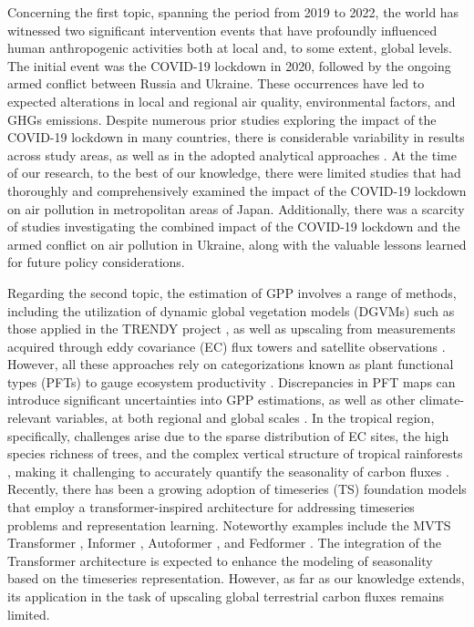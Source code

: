 Concerning the first topic, spanning the period from 2019 to 2022, the world has witnessed two significant intervention events that have profoundly influenced human anthropogenic activities both at local and, to some extent, global levels. The initial event was the COVID-19 lockdown in 2020, followed by the ongoing armed conflict between Russia and Ukraine. These occurrences have led to expected alterations in local and regional air quality, environmental factors, and GHGs emissions. Despite numerous prior studies exploring the impact of the COVID-19 lockdown in many countries, there is considerable variability in results across study areas, as well as in the adopted analytical approaches \citep{shi2021abrupt, grange2021covid}. At the time of our research, to the best of our knowledge, there were limited studies that had thoroughly and comprehensively examined the impact of the COVID-19 lockdown on air pollution in metropolitan areas of Japan. Additionally, there was a scarcity of studies investigating the combined impact of the COVID-19 lockdown and the armed conflict on air pollution in Ukraine, along with the valuable lessons learned for future policy considerations. \par

Regarding the second topic, the estimation of GPP involves a range of methods, including the utilization of dynamic global vegetation models (DGVMs) such as those applied in the TRENDY project \citep{sitch2015recent, le2018global}, as well as upscaling from measurements acquired through eddy covariance (EC) flux towers and satellite observations \citep{jung2019fluxcom, zeng2020global}. However, all these approaches rely on categorizations known as plant functional types (PFTs) to gauge ecosystem productivity \citep{poulter2011plant, poulter2015plant, lin2021improved, guo2023estimating, yan2023integrating}. Discrepancies in PFT maps can introduce significant uncertainties into GPP estimations, as well as other climate-relevant variables, at both regional and global scales \citep{poulter2011plant}. In the tropical region, specifically, challenges arise due to the sparse distribution of EC sites, the high species richness of trees, and the complex vertical structure of tropical rainforests \citep{montgomery2001forest}, making it challenging to accurately quantify the seasonality of carbon fluxes \citep{xu2015satellite}. Recently, there has been a growing adoption of timeseries (TS) foundation models that employ a transformer-inspired architecture for addressing timeseries problems and representation learning. Noteworthy examples include the MVTS Transformer \citep{zerveas2021transformer}, Informer \citep{zhou2021informer}, Autoformer \citep{wu2021autoformer}, and Fedformer \citep{zhou2022fedformer}. The integration of the Transformer architecture is expected to enhance the modeling of seasonality based on the timeseries representation. However, as far as our knowledge extends, its application in the task of upscaling global terrestrial carbon fluxes remains limited. \par

